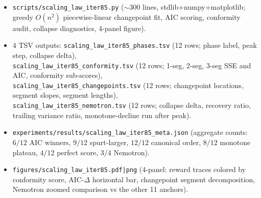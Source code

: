 \begin{itemize}
    \item \texttt{scripts/scaling\_law\_iter85.py} ($\sim$300 lines,
        stdlib+numpy+matplotlib; greedy $O(n^2)$ piecewise-linear
        changepoint fit, AIC scoring, conformity audit, collapse
        diagnostics, 4-panel figure).
    \item 4 TSV outputs: \texttt{scaling\_law\_iter85\_phases.tsv}
        (12 rows; phase label, peak step, collapse delta),\\
        \texttt{scaling\_law\_iter85\_conformity.tsv} (12 rows; 1-seg,
        2-seg, 3-seg SSE and AIC, conformity sub-scores),\\
        \texttt{scaling\_law\_iter85\_changepoints.tsv} (12 rows;
        changepoint locations, segment slopes, segment lengths),\\
        \texttt{scaling\_law\_iter85\_nemotron.tsv} (12 rows;
        collapse delta, recovery ratio, trailing variance ratio,
        monotone-decline run after peak).
    \item \texttt{experiments/results/scaling\_law\_iter85\_meta.json}
        (aggregate counts: $6/12$ AIC winners, $9/12$ spurt-larger,
        $12/12$ canonical order, $8/12$ monotone plateau, $4/12$
        perfect score, $3/4$ Nemotron).
    \item \texttt{figures/scaling\_law\_iter85.pdf|png} (4-panel:
        reward traces colored by conformity score, AIC-$\Delta$
        horizontal bar, changepoint segment decomposition, Nemotron
        zoomed comparison vs the other 11 anchors).
\end{itemize}


